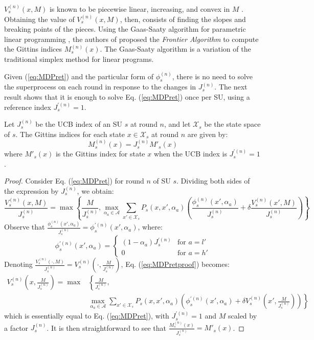 $V_s^{(n)}(x,M)$ is known to be piecewise linear, increasing, and convex in $M$ \cite{ref:Brown2013}. Obtaining the value of $V_s^{(n)}(x,M)$, then, consists of finding the slopes and breaking points of the pieces. Using the Gaas-Saaty algorithm for parametric linear programming \cite{ref:Gass1955}, the authors of \cite{ref:Brown2013} proposed the \textit{Frontier Algorithm} to compute the Gittins indices $M_s^{(n)}(x)$. The Gaas-Saaty algorithm is a variation of the traditional simplex method for linear programs.

Given (\ref{eq:MDPret}) and the particular form of $\phi_s^{(n)}$, there is no need to solve the superprocess on each round in response to the changes in $J_s^{(n)}$. The next result shows that it is enough to solve Eq. (\ref{eq:MDPret}) once per SU, using a reference index $J_s^{\prime(n)} = 1$.
\begin{prop}
Let $J_s^{(n)}$ be the UCB index of an SU $s$ at round $n$, and let $\mathcal{X}_s$ be the state space of $s$. The Gittins indices for each state $x \in \mathcal{X}_s$ at round $n$ are given by:
\begin{equation}
M_s^{(n)}(x) = J_s^{(n)}M'_s(x)
\end{equation}  
where $M'_s(x)$ is the Gittins index for state $x$ when the UCB index is $J_s^{\prime(n)} = 1$.
\end{prop}
\begin{proof}
Consider Eq. (\ref{eq:MDPret}) for round $n$ of SU $s$. Dividing both sides of the expression by $J_s^{(n)}$, we obtain:
\begin{equation}\label{eq:MDPretproof}
\frac{V_s^{(n)}(x,M)}{J_s^{(n)}} = \max\left\{\frac{M}{J_s^{(n)}},\max_{\alpha_a \in \mathcal{A}} \sum_{x' \in \mathcal{X}_s} P_s(x,x',\alpha_a)\left(\frac{\phi_s^{(n)}(x',\alpha_a)}{J_s^{(n)}}+\delta \frac{V_s^{(n)}(x',M)}{J_s^{(n)}}\right)\right\}
\end{equation}
Observe that $\frac{\phi_s^{(n)}(x',\alpha_a)}{J_s^{(n)}} = \phi_s^{\prime(n)}(x',\alpha_a)$, where:
\begin{equation}
\phi_s^{\prime(n)}(x',\alpha_a) = 
\begin{cases}
    (1 - \alpha_a) J_s^{\prime(n)} & \text{for } a = l'\\
    0 & \text{for } a = h'
   \end{cases}
\end{equation}
Denoting $\frac{V_s^{(n)}(\cdot,M)}{J_s^{(n)}} = V_s^{(n)}(\cdot,\frac{M}{J_s^{(n)}})$, Eq. (\ref{eq:MDPretproof}) becomes:
\begin{equation}
\begin{array}{ll}
V_s^{(n)}\left(x,\frac{M}{J_s^{(n)}}\right) = \max & \left\{\frac{M}{J_s^{(n)}},\right.\\
&\left.\underset{\alpha_a \in \mathcal{A}}\max \sum_{x' \in \mathcal{X}_s} P_s(x,x',\alpha_a)\left(\phi_s^{\prime(n)}(x',\alpha_a)+\delta V_s^{(n)}\left(x',\frac{M}{J_s^{(n)}}\right)\right)\right\}
\end{array}
\end{equation} 
which is essentially equal to Eq. (\ref{eq:MDPret}), with $J_s^{\prime(n)} = 1$ and $M$ scaled by a factor $J_s^{(n)}$. It is then straightforward to see that $\frac{M_s^{(n)}(x)}{J_s^{(n)}} = M'_s(x)$.
\end{proof}
